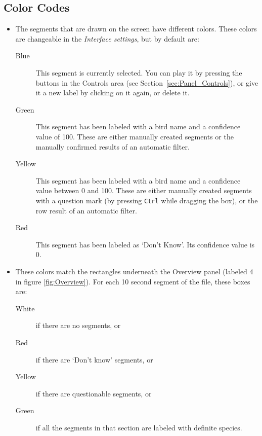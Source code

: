 \documentclass{scrartcl}
\begin{document}
\subsection{Color Codes}\label{sec:ColorCodes}

\begin{itemize}

\item The segments that are drawn on the screen have different colors. These colors are changeable in the \textit{Interface settings}, but by default are:
	\begin{description} 
	\item[Blue] This segment is currently selected. You can play it by pressing the buttons in the Controls area (see Section~\ref{sec:Panel_Controls}), or give it a new label by clicking on it again, or delete it. 
	\item[Green] This segment has been labeled with a bird name and a confidence value of 100. These are either manually created segments or the manually confirmed results of an automatic filter.
	\item[Yellow] This segment has been labeled with a bird name and a confidence value between 0 and 100. These are either manually created segments with a question mark (by pressing \texttt{Ctrl} while dragging the box), or the row result of an automatic filter. 
	\item[Red] This segment has been labeled as `Don't Know'. Its confidence value is 0.
	\end{description}

\item These colors match the rectangles underneath the Overview panel (labeled 4 in figure \ref{fig:Overview}).
	For each 10 second segment of the file, these boxes are:
	\begin{description} 
 	\item[White] if there are no segments, or
	\item[Red] if there are `Don't know' segments, or
	\item[Yellow] if there are questionable segments, or 
	\item[Green] if all the segments in that section are labeled with definite species. 
	\end{description}


\end{itemize}
\end{document}
